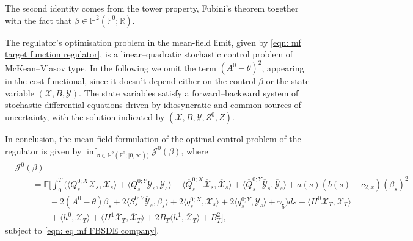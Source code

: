 \documentclass[10pt,a4paper]{amsart}
\numberwithin{equation}{section}
\newcommand{\E}{\mathbb{E}}
\newcommand{\F}{\mathbb{F}}
\newcommand{\R}{\mathbb{R}}
\renewcommand{\bar}{\overline}
\begin{document}
The second identity comes from the tower property, Fubini's theorem together with the fact that $\beta\in \mathbb{H}^2(\F^0;\R)$. 

The regulator’s optimisation problem in the mean-field limit, given by \eqref{eqn: mf target function regulator}, is a linear–quadratic stochastic control problem of McKean–Vlasov type. In the following we omit the term $(A^0 - \theta)^2$, appearing in the cost functional, since it doesn't depend either on the control $\beta$ or the state variable $(\mathcal{X}, B, \mathcal{Y})$. The state variables satisfy a forward–backward system of stochastic differential equations driven by idiosyncratic and common sources of uncertainty, with the solution indicated by $(\mathcal{X}, B, \mathcal{Y}, Z^0, Z)$. 


In conclusion, the mean-field formulation of the optimal control problem of the regulator is given by $\inf_{\beta \in \mathbb{H}^2(\F^0;[0,\infty))}\mathcal{J}^0(\beta)$, where
\begin{align}
&\label{eqn: convex target function mf regulator}
    \mathcal{J}^0(\beta) \\
    &\nonumber\qquad = \E\Bigg[ \int_0^T (\langle Q^{0;X}_s \mathcal{X}_s,\mathcal{X}_s\rangle+\langle Q^{0;Y}_s \mathcal{Y}_s,\mathcal{Y}_s\rangle + \langle \bar{Q}^{0;X}_s \bar{\mathcal{X}}_s, \bar{\mathcal{X}}_s\rangle+ \langle \bar{Q}^{0;Y}_s \bar{\mathcal{Y}}_s, \bar{\mathcal{Y}}_s\rangle +a(s)(b(s) -  c_{2,x})( \beta_s)^2\\
    &\nonumber\qquad \qquad  -2(A^0 - \theta)\beta_s+ 2 \langle S^{0;Y}_s \bar{\mathcal{Y}}_s , \beta_s \rangle + 2 \langle q^{0;X}_s , \mathcal{X}_s\rangle + 2 \langle q^{0;Y}_s ,\mathcal{Y}_s\rangle + \gamma_5) ds + \langle H^0 \mathcal{X}_T , \mathcal{X}_T\rangle\\
    &\nonumber\qquad\qquad+ \langle h^0, \mathcal{X}_T\rangle+ \langle H^1\bar{\mathcal{X}}_T, \bar{\mathcal{X}}_T\rangle + 2B_T\langle h^1,\bar{\mathcal{X}}_T\rangle + B^2_T\Bigg],
\end{align}
subject to \eqref{eqn: eq mf FBSDE company}. 
\end{document}
